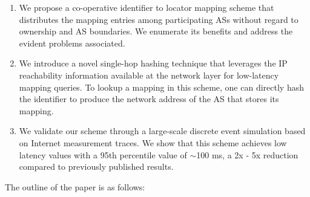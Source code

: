 \begin{enumerate}
\item 
We propose a co-operative identifier to locator mapping scheme that distributes the mapping entries among participating ASs without regard to ownership and AS boundaries. We enumerate its benefits and address the evident problems associated.

\item 
We introduce a novel single-hop hashing technique that leverages the IP reachability information available at the network layer for low-latency mapping queries. To lookup a mapping in this scheme, one can directly hash the identifier to produce the network address of the AS that stores its mapping. 

\item 
We validate our scheme through a large-scale discrete event simulation based on Internet measurement traces. We show that this scheme achieves low latency values with a 95th percentile value of $\sim$100 ms, a 2x - 5x reduction compared to previously published results. 

\end{enumerate}

The outline of the paper is as follows:


